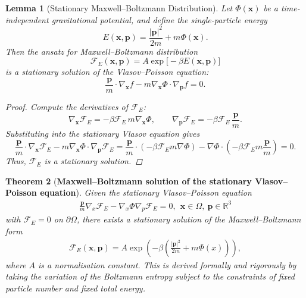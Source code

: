 \documentclass[12pt,a4paper]{article}
\newtheorem{thm}{Theorem}[section]
\newtheorem{lem}[thm]{Lemma}
\numberwithin{equation}{section}
\begin{document}
\begin{lem}[Stationary Maxwell--Boltzmann Distribution]
Let $\Phi(\mathbf{x})$ be a time-independent gravitational potential, and define the
single-particle energy
\begin{equation}
E(\mathbf{x},\mathbf{p}) = \frac{|\mathbf{p}|^2}{2m} + m \Phi(\mathbf{x}).
\end{equation}
Then the ansatz for Maxwell--Boltzmann distribution
\begin{equation}
\mathcal{F}_{E}(\mathbf{x},\mathbf{p}) = A \exp\big[-\beta E(\mathbf{x},\mathbf{p})\big]
\end{equation}
is a stationary solution of the Vlasov--Poisson equation:
\begin{equation}
\frac{\mathbf{p}}{m} \cdot \nabla_{\mathbf{x}} f - m\nabla_{\mathbf{x}} \Phi \cdot \nabla_{\mathbf{p}} f = 0.
\end{equation}
\begin{proof}
Compute the derivatives of $\mathcal{F}_{E}$:
\begin{equation}
\nabla_{\mathbf{x}} \mathcal{F}_{E} = -\beta \mathcal{F}_{E} \, m \nabla_{\mathbf{x}} \Phi, \qquad
\nabla_{\mathbf{p}} \mathcal{F}_{E} = -\beta \mathcal{F}_{E} \, \frac{\mathbf{p}}{m}.
\end{equation}
Substituting into the stationary Vlasov equation gives
\begin{equation}
\frac{\mathbf{p}}{m} \cdot \nabla_{\mathbf{x}} \mathcal{F}_{E} - m\nabla_{\mathbf{x}} \Phi \cdot \nabla_{\mathbf{p}} \mathcal{F}_{E}
=\frac{\mathbf{p}}{m} \cdot (-\beta \mathcal{F}_{E} m \nabla \Phi) - \nabla \Phi \cdot (-\beta \mathcal{F}_{E} m
\frac{\mathbf{p}}{m}) = 0.
\end{equation}
Thus, $\mathcal{F}_{E}$ is a stationary solution.
\end{proof}
\end{lem}


\begin{thm}[\textbf{Maxwell--Boltzmann solution of the stationary Vlasov--Poisson equation}]
Given the stationary Vlasov--Poisson equation
\begin{align}
\frac{\mathbf{p}}{m}\nabla_{x}\mathcal{F}_{E}-\nabla_{x}\Phi\nabla_{p}\mathcal{F}_{E}=0,~~\mathbf{x}\in\Omega,~\mathbf{p}\in\mathbb{R}^{3}
\end{align}
with $\mathcal{F}_{E}=0$ on $\partial\Omega$, there exists a stationary solution of the Maxwell--Boltzmann form
\begin{align}
\mathcal{F}_{E}(\mathbf{x},\mathbf{p})=A\exp\left(-\beta\left(\frac{|\mathbf{p}|^{2}}{2m}+m\Phi(x)\right)\right),
\end{align}
where $A$ is a normalisation constant. This is derived formally and rigorously by taking the variation of the Boltzmann entropy subject to the constraints of fixed particle number and fixed total energy.
\end{thm}
\end{document}
